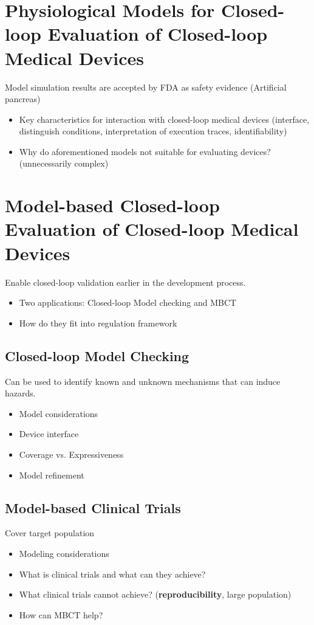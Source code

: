 \documentclass[a4paper]{article}
\begin{document}
\section{Physiological Models for Closed-loop Evaluation of Closed-loop Medical Devices}
Model simulation results are accepted by FDA as safety evidence (Artificial pancreas)
\begin{itemize}
	\item Key characteristics for interaction with closed-loop medical devices (interface, distinguish conditions, interpretation of execution traces, identifiability)
	\item Why do aforementioned models not suitable for evaluating devices? (unnecessarily complex)
\end{itemize}

\section{Model-based Closed-loop Evaluation of Closed-loop Medical Devices}
Enable closed-loop validation earlier in the development process.
\begin{itemize}
	\item Two applications: Closed-loop Model checking and MBCT
	\item How do they fit into regulation framework

\end{itemize}

\subsection{Closed-loop Model Checking}
Can be used to identify known and unknown mechanisms that can induce hazards.
\begin{itemize}
	\item  Model considerations
	\item Device interface
	\item Coverage vs. Expressiveness
	\item Model refinement
\end{itemize}

\subsection{Model-based Clinical Trials}
Cover target population

\begin{itemize}
	\item Modeling considerations
	\item What is clinical trials and what can they achieve?
	\item What clinical trials cannot achieve? (\textbf{reproducibility}, large population)
	\item How can MBCT help?
\end{itemize}
\end{document}
